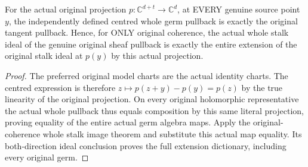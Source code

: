 \begin{theorem}
\label{hir:actual-coordinate-projection-entire-original-stalk-ideal}
\leanok
For the actual original projection $p:\mathbb C^{d+t}\to\mathbb C^d$,
at EVERY genuine source point $y$, the independently defined centred whole
germ pullback is exactly the original tangent pullback. Hence, for ONLY
original coherence, the actual whole stalk ideal of the genuine original
sheaf pullback is exactly the entire extension of the original stalk ideal
at $p(y)$ by this actual projection.
\end{theorem}
\begin{proof}
The preferred original model charts are the actual identity charts. The
centred expression is therefore $z\mapsto p(z+y)-p(y)=p(z)$ by the true
linearity of the original projection. On every original holomorphic
representative the actual whole pullback thus equals composition by this
same literal projection, proving equality of the entire actual germ algebra
maps. Apply the original-coherence whole stalk image theorem and substitute
this actual map equality. Its both-direction ideal conclusion proves the
full extension dictionary, including every original germ.
\end{proof}

